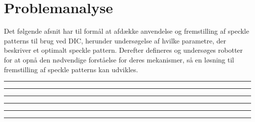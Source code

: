 \chapter{Problemanalyse} \label{Problemanalyse}
Det følgende afsnit har til formål at afdække anvendelse og fremstilling af speckle patterns til brug ved DIC, herunder undersøgelse af hvilke parametre, der beskriver et optimalt speckle pattern. Derefter defineres og undersøges robotter for at opnå den nødvendige forståelse for deres mekanismer, så en løsning til fremstilling af speckle patterns kan udvikles.

 


\plainbreak{2}  
\plainbreak{1} 

\plainbreak{2}  

\plainbreak{2} 
\plainbreak{1}
\plainbreak{1} 
